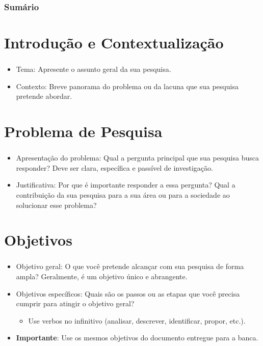 \documentclass[aspectratio=169]{beamer}
\author{Nome do autor}
\begin{document}
	
\frame{
	\titlepage
}
	
\begin{frame}[fragile]
	\frametitle{Sumário}
		\centering
		\tableofcontents
\end{frame}
	
\section{Introdução e Contextualização}
	
\begin{frame}[fragile]
	\frametitle{\secname}
	\begin{itemize}
		\item Tema: Apresente o assunto geral da sua pesquisa.
		\item Contexto: Breve panorama do problema ou da lacuna que sua pesquisa pretende abordar.
	\end{itemize}
\end{frame}


\section{Problema de Pesquisa }

\begin{frame}[fragile]
	\frametitle{\secname}
	\begin{itemize}
		\item Apresentação do problema: Qual a pergunta principal que sua pesquisa busca responder? Deve ser clara, específica e passível de investigação.
		\item Justificativa: Por que é importante responder a essa pergunta? Qual a contribuição da sua pesquisa para a sua área ou para a sociedade ao solucionar esse problema?
	\end{itemize}
\end{frame}


\section{Objetivos}

\begin{frame}[fragile]
	\frametitle{\secname}
	\begin{itemize}
		\item Objetivo geral: O que você pretende alcançar com sua pesquisa de forma ampla? Geralmente, é um objetivo único e abrangente.
		\item Objetivos específicos: Quais são os passos ou as etapas que você precisa cumprir para atingir o objetivo geral? 
		\begin{itemize}
			\item Use verbos no infinitivo (analisar, descrever, identificar, propor, etc.).
		\end{itemize}
		\item \textbf{Importante}: Use os mesmos objetivos do documento entregue para a banca.
	\end{itemize}
\end{frame}
\end{document}

